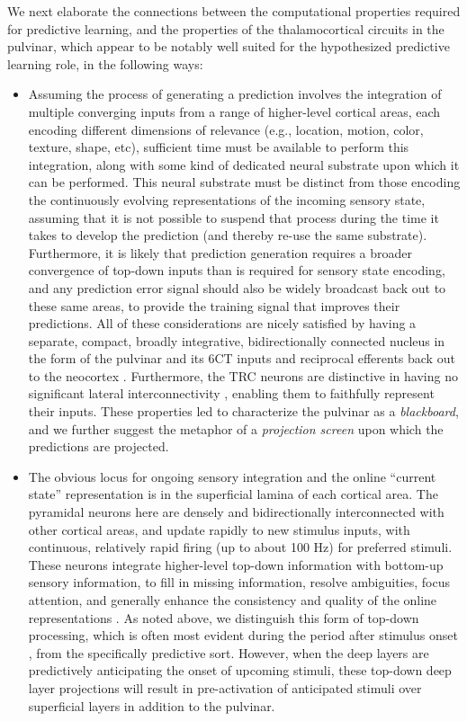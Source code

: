 \documentclass[11pt,twoside]{article}
\newif\myifpdf
\begin{document}
We next elaborate the connections between the computational properties required for predictive learning, and the properties of the thalamocortical circuits in the pulvinar, which appear to be notably well suited for the hypothesized predictive learning role, in the following ways:
\begin{itemize}

	\item Assuming the process of generating a prediction involves the integration of multiple converging inputs from a range of higher-level cortical areas, each encoding different dimensions of relevance (e.g., location, motion, color, texture, shape, etc), sufficient time must be available to perform this integration, along with some kind of dedicated neural substrate upon which it can be performed.  This neural substrate must be distinct from those encoding the continuously evolving representations of the incoming sensory state, assuming that it is not possible to suspend that process during the time it takes to develop the prediction (and thereby re-use the same substrate).  Furthermore, it is likely that prediction generation requires a broader convergence of top-down inputs than is required for sensory state encoding, and any prediction error signal should also be widely broadcast back out to these same areas, to provide the training signal that improves their predictions.  All of these considerations are nicely satisfied by having a separate, compact, broadly integrative, bidirectionally connected nucleus in the form of the pulvinar and its 6CT inputs and reciprocal efferents back out to the neocortex \citep{Shipp03}.  Furthermore, the TRC neurons are distinctive in having no significant lateral interconnectivity \citep{ShermanGuillery06}, enabling them to faithfully represent their inputs.  These properties led \citet{Mumford91} to characterize the pulvinar as a \emph{blackboard}, and we further suggest the metaphor of a \emph{projection screen} upon which the predictions are projected.

	\item The obvious locus for ongoing sensory integration and the online ``current state'' representation is in the superficial lamina of each cortical area.  The pyramidal neurons here are densely and bidirectionally interconnected with other cortical areas, and update rapidly to new stimulus inputs, with continuous, relatively rapid firing (up to about 100 Hz) for preferred stimuli.  These neurons integrate higher-level top-down information with bottom-up sensory information, to fill in missing information, resolve ambiguities, focus attention, and generally enhance the consistency and quality of the online representations \citep{DesimoneDuncan95,ReynoldsChelazziDesimone99,MillerCohen01,OReillyWyatteHerdEtAl13,OReillyMunakataFrankEtAl12,OReillyHazyHerd16}. As noted above, we distinguish this form of top-down processing, which is often most evident during the period after stimulus onset \citep{LeeMumford03}, from the specifically predictive sort.  However, when the deep layers are predictively anticipating the onset of upcoming stimuli, these top-down deep layer projections will result in pre-activation of anticipated stimuli over superficial layers in addition to the pulvinar.


\end{itemize}
\end{document}
